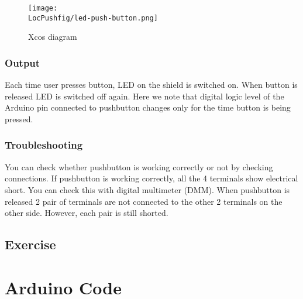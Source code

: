 \begin{figure}
\centering
\texttt{[image: \\LocPushfig/led-push-button.png]}
\caption{Xcos diagram}
\label{fig:ledpushbutton}
\end{figure}


\subsubsection{Output}
Each time user presses button, LED on the shield is switched on. When button is released LED is switched off again. Here we note that digital logic level of the Arduino pin connected to pushbutton changes only for the time button is being pressed. 


\subsubsection{Troubleshooting}
You can check whether pushbutton is working correctly or not by checking connections. If pushbutton is working correctly, all the 4 terminals show electrical short. You can check this with digital multimeter (DMM). When pushbutton is released 2 pair of terminals are not connected to the other 2 terminals on the other side. However, each pair is still shorted.


\subsection{Exercise}

\section{Arduino Code}
\lstset{style=mystyle}
\label{sec:push-arduino-code}

\begin{ardcode}
\label{ard:push-status}

\end{ardcode}

\begin{ardcode}
\label{ard:led-blue}

\end{ardcode}



